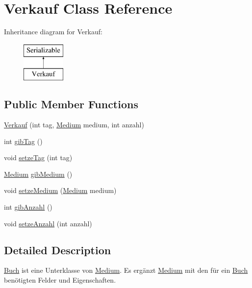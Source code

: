 \hypertarget{classVerkauf}{\section{Verkauf Class Reference}
\label{classVerkauf}
}
Inheritance diagram for Verkauf\-:\begin{figure}[H]
\begin{center}
\leavevmode
\includegraphics[height=2.000000cm]{classVerkauf}
\end{center}
\end{figure}
\subsection*{Public Member Functions}
\begin{DoxyCompactItemize}
\item 
\hyperlink{classVerkauf_a4c8bbcde7335b2484f8eea62e599fdda}{Verkauf} (int tag, \hyperlink{classMedium}{Medium} medium, int anzahl)
\item 
int \hyperlink{classVerkauf_a42cd9d706f948f243061a2bb063f625b}{gib\-Tag} ()
\item 
void \hyperlink{classVerkauf_a8507ef60bc4c288a67e0b7ad9cc61353}{setze\-Tag} (int tag)
\item 
\hyperlink{classMedium}{Medium} \hyperlink{classVerkauf_af628966d388e8d02bac45714f22d3d8f}{gib\-Medium} ()
\item 
void \hyperlink{classVerkauf_a609846c3a27057784339569a6d2fd880}{setze\-Medium} (\hyperlink{classMedium}{Medium} medium)
\item 
int \hyperlink{classVerkauf_ab5a8d75e43a4f0798a7860c74d56c300}{gib\-Anzahl} ()
\item 
void \hyperlink{classVerkauf_a236dcf8276e6609b05e236a99213b031}{setze\-Anzahl} (int anzahl)
\end{DoxyCompactItemize}


\subsection{Detailed Description}
\hyperlink{classBuch}{Buch} ist eine Unterklasse von \hyperlink{classMedium}{Medium}. Es ergänzt \hyperlink{classMedium}{Medium} mit den für ein \hyperlink{classBuch}{Buch} benötigten Felder und Eigenschaften.

